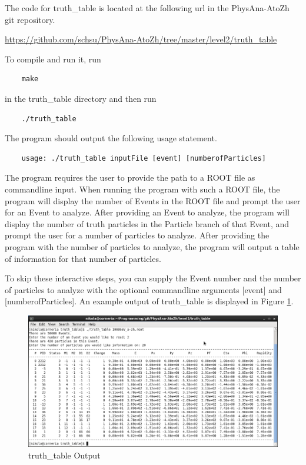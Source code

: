 \documentclass{article}
\begin{document}
\bigskip

The code for truth\_table is located at the following url in the PhysAna-AtoZh git repository.

\bigskip

\url{https://github.com/schsu/PhysAna-AtoZh/tree/master/level2/truth_table}

\bigskip

To compile and run it, run

\begin{verbatim}
	make
\end{verbatim} 

in the truth\_table directory and then run

\begin{verbatim}
	./truth_table
\end{verbatim}

The program should output the following usage statement.

\begin{verbatim}
	usage: ./truth_table inputFile [event] [numberofParticles]
\end{verbatim}

The program requires the user to provide the path to a ROOT file as commandline input. When running the program with such a ROOT file, the program will display the number of Events in the ROOT file and prompt the user for an Event to analyze. After providing an Event to analyze, the program will display the number of truth particles in the Particle branch of that Event, and prompt the user for a number of particles to analyze. After providing the program with the number of particles to analyze, the program will output a table of information for that number of particles.

\bigskip

To skip these interactive steps, you can supply the Event number and the number of particles to analyze with the optional commandline arguments [event] and [numberofParticles]. An example output of truth\_table is displayed in Figure \ref{fig:truthTableOutput}.

\begin{figure}[h]
	\centering
	\includegraphics[width = \linewidth]{truth_table_screenshot.png}
	\caption{truth\_table Output}
	\label{fig:truthTableOutput}
\end{figure}
\end{document}
